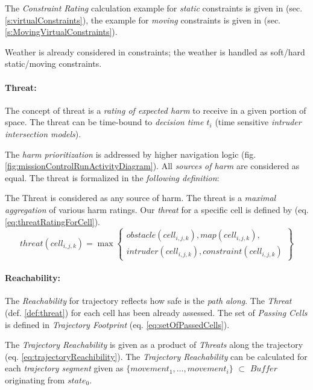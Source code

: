 \noindent The \emph{Constraint Rating} calculation example for \emph{static} constraints is given in (sec. \ref{s:virtualConstraints}), the example for \emph{moving} constraints is given in (sec. \ref{s:MovingVirtualConstraints}).

\begin{note}{Weather}
    is already considered in constraints; the weather is handled as soft/hard static/moving constraints.
\end{note}

\paragraph{Threat:} The concept of threat is a \emph{rating of expected harm} to receive in a given portion of space. The threat can be time-bound to \emph{decision time $t_i$} (time sensitive \emph{intruder intersection models}).

The \emph{harm prioritization} is addressed by higher navigation logic (fig. \ref{fig:missionControlRunActivityDiagram}). All \emph{sources of harm} are considered as equal. The threat is formalized in the \emph{following definition}:

\begin{definition}{The Threat}\label{def:threat} is considered as any source of harm. The threat is a \emph{maximal aggregation} of various harm ratings. Our \emph{threat} for a  specific cell is defined by (eq. \ref{eq:threatRatingForCell}).
    \begin{equation}\label{eq:threatRatingForCell}
        threat(cell_{i,j,k}) = \max\left\{\begin{gathered}obstacle(cell_{i,j,k}),map(cell_{i,j,k}),\\intruder(cell_{i,j,k}),constraint(cell_{i,j,k})\end{gathered}\right\}
    \end{equation}
\end{definition}

\paragraph{Reachability:} The \emph{Reachability} for trajectory reflects how safe is the \emph{path along}. The \emph{Threat} (def. \ref{def:threat}) for each cell has been already assessed.  The set of \emph{Passing Cells} is defined in \emph{Trajectory Footprint} (eq. \ref{eq:setOfPassedCells}).

The \emph{Trajectory Reachability} is given as a product of \emph{Threats} along the trajectory (eq. \ref{eq:trajectoryReachibility}). The \emph{Trajectory Reachability} can be calculated for each \emph{trajectory segment} given as $\{movement_1,\dots,movement_i\}$ $\subset$ $Buffer$ originating from $state_0$.


